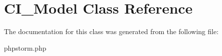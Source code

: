 \hypertarget{class_c_i___model}{}\section{C\+I\+\_\+\+Model Class Reference}
\label{class_c_i___model}


The documentation for this class was generated from the following file\+:\begin{DoxyCompactItemize}
\item 
phpstorm.\+php\end{DoxyCompactItemize}
